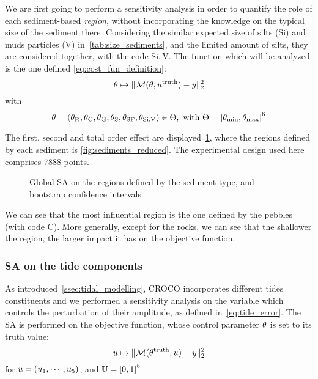 \documentclass[../../Main_ManuscritThese.tex]{subfiles}
\newcommand{\CROCO}{CROCO}
\newcommand\imgpath{/home/victor/acadwriting/Manuscrit/Text/Chapter5/img/}
\begin{document}
We are first going to perform a sensitivity analysis in order to
quantify the role of each sediment-based \emph{region}, without
incorporating the knowledge on the typical size of the sediment there.
Considering the similar expected size of silts (Si) and muds particles
(V) in~\cref{tab:size_sediments}, and the limited amount of silts,
they are considered together, with the code $\mathrm{Si,V}$.
The function which will be analyzed is the one defined
\cref{eq:cost_fun_definition}:
\begin{equation}
\theta \mapsto \|\mathcal{M}(\theta, u^{\mathrm{truth}}) - y \|_2^2
\end{equation}
with
\begin{equation}
  \kk = (\kk_{\mathrm{R}},\kk_{\mathrm{C}},\kk_{\mathrm{G}},\kk_{\mathrm{S}},
  \kk_{\mathrm{SF}},\kk_{\mathrm{Si,V}})\in\Kspace, \text{ with }
  \Kspace = \interval{\kk_{\min}}{\kk_{\max}}^6
\end{equation}

The first, second and total order effect are
displayed~\cref{fig:SA_sediments}, where the regions defined by each
sediment is \cref{fig:sediments_reduced}. The experimental design used
here comprises \num{7888} points.

\label{ssec:SA_sediments}
\begin{figure}[ht]
  \centering
  
  \caption[SA on the sediments-based regions]{\label{fig:SA_sediments} Global SA on the regions defined by the sediment type, and bootstrap confidence intervals}
\end{figure}

We can see that the most influential region is the one defined by the
pebbles (with code C). More generally, except for the rocks, we can
see that the shallower the region, the larger impact it has on the
objective function. 


\subsubsection{SA on the tide components}
\label{ssec:SA_tide}
As introduced~\cref{ssec:tidal_modelling}, \CROCO{} incorporates
different tides constituents and we performed a sensitivity analysis
on the variable which controls the perturbation of their amplitude, as
defined in~\cref{eq:tide_error}. The SA is performed on the objective function, whose control parameter $\theta$ is set to its truth value:
\begin{equation}
  u \mapsto  \| \mathcal{M}(\theta^{\mathrm{truth}}, u) - y \|_2^2
\end{equation}
for $u = (u_1,\cdots,u_5)$, and $\Uspace = \interval{0}{1}^5$
\end{document}
